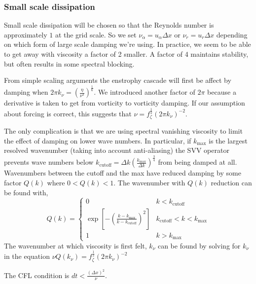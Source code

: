 \documentclass[11pt]{article}
\begin{document}
\subsubsection{Small scale dissipation}

Small scale dissipation will be chosen so that the Reynolds number is approximately $1$ at the grid scale. So we set $\nu_\alpha=u_\alpha \Delta x$ or $\nu_r=u_r \Delta x$ depending on which form of large scale damping we're using. In practice, we seem to be able to get away with viscosity a factor of 2 smaller. A factor of 4 maintains stability, but often results in some spectral blocking.

From simple scaling arguments the enstrophy cascade will first be affect by damping when $ 2 \pi k_\nu=\left( \frac{ \eta}{\nu^3} \right)^{\frac{1}{6}}$. We introduced another factor of $2\pi$ because a derivative is taken to get from vorticity to vorticity damping. If our assumption about forcing is correct, this suggests that $\nu = f_\zeta^\frac{1}{2} (2 \pi k_\nu)^{-2}$.

The only complication is that we are using spectral vanishing viscosity to limit the effect of damping on lower wave numbers. In particular, if $k_{\textrm{max}}$ is the largest resolved wavenumber (taking into account anti-aliasing) the SVV operator prevents wave numbers below $k_{\textrm{cutoff}}=\Delta k \left(\frac{k_{\textrm{max}}}{\Delta k} \right)^{\frac{3}{4}}$ from being damped at all. Wavenumbers between the cutoff and the max have reduced damping by some factor $Q(k)$ where $0<Q(k)<1$. The wavenumber with $Q(k)$ reduction can be found with,
\begin{equation}
Q(k) = 
\begin{cases}
0 & k < k_{\textrm{cutoff}} \\
\exp \left[ - \left( \frac{k-k_{\textrm{max}}}{k-k_{\textrm{cutoff}}} \right)^2 \right] & k_{\textrm{cutoff}} < k < k_{\textrm{max}} \\
1 & k > k_{\textrm{max}}
\end{cases}
\end{equation}
The wavenumber at which viscosity is first felt, $k_\nu$ can be found by solving for $k_\nu$ in the equation $\nu Q(k_\nu) = f_\zeta^\frac{1}{2} (2 \pi k_\nu)^{-2}$

The CFL condition is $dt < \frac{(\Delta x)^2}{\nu}$.
\end{document}
